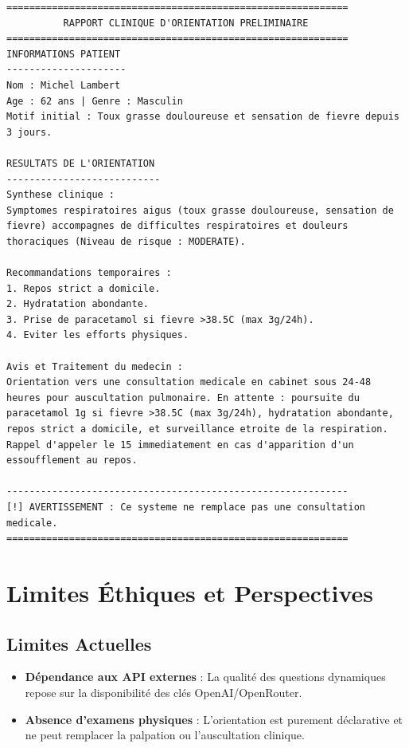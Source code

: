 \documentclass[11pt,a4paper]{report}
\begin{document}
\begin{lstlisting}[basicstyle=\ttfamily\tiny, frame=single, caption=Rapport final stocke en base pour Michel Lambert]
============================================================
          RAPPORT CLINIQUE D'ORIENTATION PRELIMINAIRE
============================================================
INFORMATIONS PATIENT
---------------------
Nom : Michel Lambert
Age : 62 ans | Genre : Masculin
Motif initial : Toux grasse douloureuse et sensation de fievre depuis 3 jours.

RESULTATS DE L'ORIENTATION
---------------------------
Synthese clinique :
Symptomes respiratoires aigus (toux grasse douloureuse, sensation de fievre) accompagnes de difficultes respiratoires et douleurs thoraciques (Niveau de risque : MODERATE).

Recommandations temporaires :
1. Repos strict a domicile.
2. Hydratation abondante.
3. Prise de paracetamol si fievre >38.5C (max 3g/24h).
4. Eviter les efforts physiques.

Avis et Traitement du medecin :
Orientation vers une consultation medicale en cabinet sous 24-48 heures pour auscultation pulmonaire. En attente : poursuite du paracetamol 1g si fievre >38.5C (max 3g/24h), hydratation abondante, repos strict a domicile, et surveillance etroite de la respiration. Rappel d'appeler le 15 immediatement en cas d'apparition d'un essoufflement au repos.

------------------------------------------------------------
[!] AVERTISSEMENT : Ce systeme ne remplace pas une consultation medicale.
============================================================
\end{lstlisting}


\chapter{Limites Éthiques et Perspectives}
\section{Limites Actuelles}
\begin{itemize}
    \item \textbf{Dépendance aux API externes} : La qualité des questions dynamiques repose sur la disponibilité des clés OpenAI/OpenRouter.
    \item \textbf{Absence d'examens physiques} : L'orientation est purement déclarative et ne peut remplacer la palpation ou l'auscultation clinique.
\end{itemize}
\end{document}
